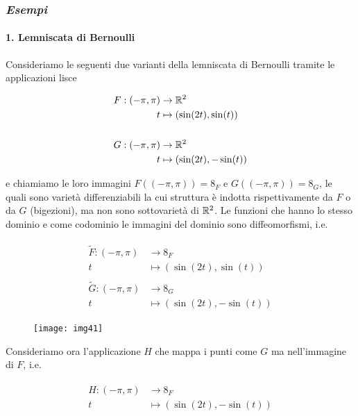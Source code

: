 \subsubsection{\textit{Esempi}}

\paragraph{1. Lemniscata di Bernoulli}

Consideriamo le seguenti due varianti della lemniscata di Bernoulli tramite le applicazioni lisce

\begin{align}
	\begin{split}
		F : (-\pi,\pi) &\to \mathbb{R}^{2}\\
		t &\mapsto (\sin(2t),\sin(t))\\\\
		G : (-\pi,\pi) &\to \mathbb{R}^{2}\\
		t &\mapsto (\sin(2t),-\sin(t))
	\end{split}
\end{align}

e chiamiamo le loro immagini $ F((-\pi,\pi)) = \mathfrak{8}_{F} $ e $ G((-\pi,\pi)) = \mathfrak{8}_{G} $, le quali sono varietà differenziabili la cui struttura è indotta rispettivamente da $ F $ o da $ G $ (bigezioni), ma non sono sottovarietà di $ \mathbb{R}^{2} $. Le funzioni che hanno lo stesso dominio e come codominio le immagini del dominio sono diffeomorfismi, i.e.

\begin{align}
	\begin{split}
		\tilde{F} : (-\pi,\pi) &\to \mathfrak{8}_{F}\\
		t &\mapsto (\sin(2t),\sin(t))\\\\
		\tilde{G} : (-\pi,\pi) &\to \mathfrak{8}_{G}\\
		t &\mapsto (\sin(2t),-\sin(t))
	\end{split}
\end{align}

\begin{figure}[H]
	\centering
	\texttt{[image: img41]}
\end{figure}

Consideriamo ora l'applicazione $ H $ che mappa i punti come $ G $ ma nell'immagine di $ F $, i.e.

\begin{align}
	\begin{split}
		H : (-\pi,\pi) &\to \mathfrak{8}_{F}\\
		t &\mapsto (\sin(2t),-\sin(t))
	\end{split}
\end{align}

